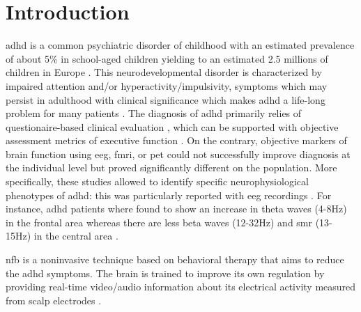 

\section{Introduction} 

\gls{adhd} is a common psychiatric disorder of childhood with an estimated prevalence of about 5\% in school-aged children yielding to an 
estimated 2.5 millions of children in Europe \citep{DSM-5}. This neurodevelopmental disorder is characterized by impaired attention and/or hyperactivity/impulsivity, symptoms which may persist 
in adulthood with clinical significance which makes \gls{adhd} a life-long problem for many patients \citep{Faraone2006}. The diagnosis of \gls{adhd} primarily relies of questionaire-based clinical evaluation \citep{DSM5}, which can be supported with objective assessment metrics of executive function \citep{tova*, cpt*, sart*}. On the contrary, objective markers of brain function using \gls{eeg}, \gls{fmri}, or \gls{pet} could not successfully improve diagnosis \cite{nebafda*, neba*} at the individual level but proved significantly different on the population. More specifically, these studies allowed to identify specific neurophysiological phenotypes of \gls{adhd}: this was particularly reported with \gls{eeg} recordings \citep{loo2017}. For instance, \gls{adhd} patients where found to show an increase in theta waves (4-8Hz) in the frontal area whereas there are less beta waves (12-32Hz) and \gls{smr} (13-15Hz) in the central area \citep{Monastra2005, Matouvsek1984,
 Janzen1995}.

\gls{nfb} is a noninvasive technique based on behavioral therapy that aims to reduce the \gls{adhd} symptoms.
 The brain is trained to improve its own regulation by providing real-time video/audio information 
about its electrical activity measured from scalp electrodes \citep{Arns2015, Steffert2010}.

